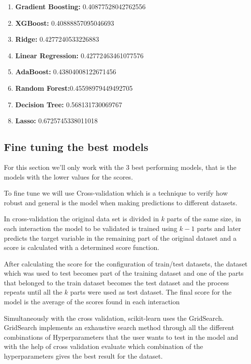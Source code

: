 \documentclass[11pt]{article}
\providecommand{\tightlist}{%
      \setlength{\itemsep}{0pt}\setlength{\parskip}{0pt}}
\begin{document}
\begin{enumerate}
\def\labelenumi{\arabic{enumi}.}
\tightlist
\item
  \textbf{Gradient Boosting:} 0.40877528042762556
\item
  \textbf{XGBoost:} 0.40888857095046693
\item
  \textbf{Ridge:} 0.4277240533226883
\item
  \textbf{Linear Regression:} 0.42772463461077576
\item
  \textbf{AdaBoost:} 0.43804008122671456
\item
  \textbf{Random Forest:}0.45598979449492705
\item
  \textbf{Decision Tree:} 0.568131730069767
\item
  \textbf{Lasso:} 0.6725745338011018
\end{enumerate}

\subsection{Fine tuning the best models}

\hspace{0.5cm}For this section we'll only work with the 3 best performing models, that is the models with the lower values for the scores. 

To fine tune we will use Cross-validation which is a technique to verify how robust and general is the model when making predictions to different datasets.

In cross-validation the original data set is divided in  $k$  parts of the same size, in each interaction the model to be validated is trained using  $k−1$  parts and later predicts the target variable in the remaining part of the original dataset and a score is calculated with a determined score function.

After calculating the score for the configuration of train/test datasets, the dataset which was used to test becomes part of the training dataset and one of the parts that belonged to the train dataset becomes the test dataset and the process repeats until all the  $k$ parts were used as test dataset. The final score for the model is the average of the scores found in each interaction

Simultaneously with the cross validation, scikit-learn uses the GridSearch. GridSearch implements an exhaustive search method through all the different combinations of Hyperparameters that the user wants to test in the model and with the help of cross validation evaluate which combination of the hyperparameters gives the best result for the dataset.
\end{document}

